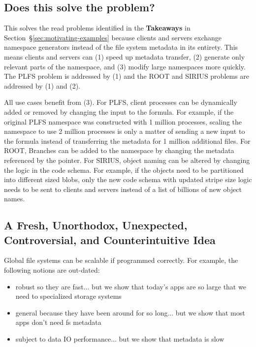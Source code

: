 \subsection*{Does this solve the problem?}

This solves the read problems identified in the \textbf{Takeaways} in
Section~\S\ref{sec:motivating-examples} because clients and servers exchange
namespace generators instead of the file system metadata in its entirety. This
means clients and servers can (1) speed up metadata transfer, (2) generate only
relevant parts of the namespace, and (3) modify large namespaces more quickly.
The PLFS problem is addressed by (1) and the ROOT and SIRIUS problems are
addressed by (1) and (2). 

All use cases benefit from (3). For PLFS, client processes can be dynamically
added or removed by changing the input to the formula.  For example, if the
original PLFS namespace was constructed with 1 million processes, scaling the
namespace to use 2 million processes is only a matter of sending a new input to
the formula instead of transferring the metadata for 1 million additional
files. For ROOT, Branches can be added to the namespace by changing the
metadata referenced by the pointer. For SIRIUS, object naming can be altered by
changing the logic in the code schema.  For example, if the objects need to be
partitioned into different sized blobs, only the new code schema with updated
stripe size logic needs to be sent to clients and servers instead of a list of
billions of new object names.

\subsection*{A Fresh, Unorthodox, Unexpected, Controversial, and Counterintuitive Idea}

Global file systems can be scalable if programmed correctly. For example, the
following notions are out-dated:

\begin{itemize}
  \setlength\itemsep{-0.5em}

  \item robust so they are fast... but we show that today's apps are so large
  that we need to specialized storage systems

  \item general because they have been around for so long... but we show that
  most apps don't need fs metadata

  \item subject to data IO performance... but we show that metadata is slow

\end{itemize}


